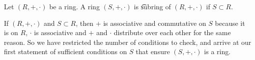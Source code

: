 
Let $(R, +, \cdot )$ be a ring.
A ring $(S, +, \cdot )$ is \t{subring} of $(R, +, \cdot )$ if $S \subset R$.

If $(R, +, \cdot )$ and $S \subset R$, then $+$ is associative and commutative on $S$ because it is on $R$, $\cdot $ is associative and $+$ and $\cdot $ distribute over each other for the same reason.
So we have restricted the number of conditions to check, and arrive at our first statement of sufficient conditions on $S$ that ensure $(S, +, \cdot )$ is a ring.

\blankpage
